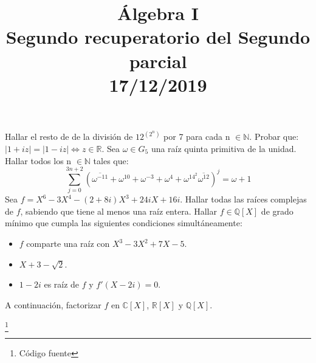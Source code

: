 \documentclass[12pt,twoside,a4paper]{exam}
\title{Álgebra I \\ Segundo recuperatorio del Segundo parcial \\ 17/12/2019}
\begin{document}
\date{}
\maketitle

\begin{questions}

\question Hallar el resto de de la división de  $12^{(2^n)}$ por 7 para cada n $\in\mathbb{N}$.
\question Probar que: $|1+iz|=|1-iz|\iff z \in \mathbb{R}$.
\question Sea $\omega\in G_5$ una raíz quinta primitiva de la unidad. Hallar todos 
          los n $\in \mathbb{N}$ tales que:\\ $$\sum_{j=0}^{3n+2}(\overline{\omega^{-11}}
          +\omega^{10}+\omega^{-3}+\omega^{4}+\omega^{14^2}\overline{\omega^{12}})^j
          =\omega + 1 $$
\question Sea $f=X^6 -3X^4 -(2+8i)X^3+24iX+16i$. Hallar todas las raíces complejas
          de $f$, sabiendo que tiene al menos una raíz entera.
\question Hallar $f\in \mathbb{Q}[X]$ de grado mínimo que cumpla las siguientes
          condiciones simultáneamente:
          \begin{itemize}
          \item $f$ comparte una raíz con $X^3-3X^2+7X-5$.
          \item $X+3-\sqrt{2}$.
          \item $1-2i$ es raíz de $f$ y $f'(X-2i)=0$.
          \end{itemize}
          A continuación, factorizar $f \text{ en } \mathbb{C}[X]$, $\mathbb{R}[X]$
          y $\mathbb{Q}[X]$.
\end{questions}
\footnote[1]{Código fuente} 
\end{document}
